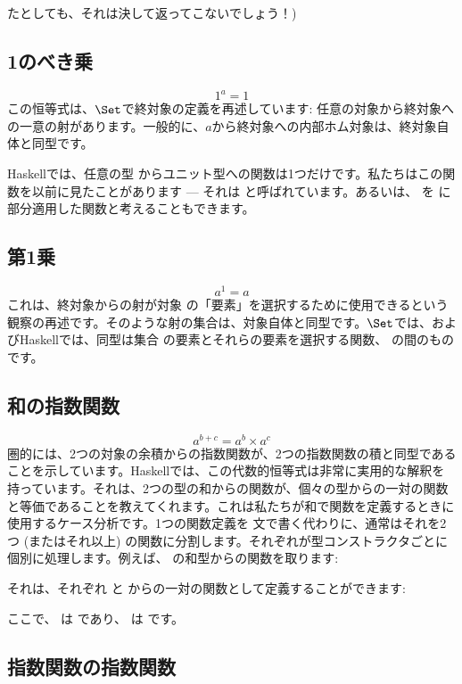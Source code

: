 たとしても、それは決して返ってこないでしょう！) 

\subsection{1のべき乗}

\[1^{a} = 1\]
この恒等式は、$\Set$で終対象の定義を再述しています: 任意の対象から終対象への一意の射があります。一般的に、$a$から終対象への内部ホム対象は、終対象自体と同型です。

Haskellでは、任意の型  からユニット型への関数は1つだけです。私たちはこの関数を以前に見たことがあります --- それは  と呼ばれています。あるいは、 を \code{()} に部分適用した関数と考えることもできます。

\subsection{第1乗}

\[a^{1} = a\]
これは、終対象からの射が対象  の「要素」を選択するために使用できるという観察の再述です。そのような射の集合は、対象自体と同型です。$\Set$では、およびHaskellでは、同型は集合  の要素とそれらの要素を選択する関数、 の間のものです。

\subsection{和の指数関数}

\[a^{b+c} = a^{b} \times a^{c}\]
圏的には、2つの対象の余積からの指数関数が、2つの指数関数の積と同型であることを示しています。Haskellでは、この代数的恒等式は非常に実用的な解釈を持っています。それは、2つの型の和からの関数が、個々の型からの一対の関数と等価であることを教えてくれます。これは私たちが和で関数を定義するときに使用するケース分析です。1つの関数定義を  文で書く代わりに、通常はそれを2つ (またはそれ以上) の関数に分割します。それぞれが型コンストラクタごとに個別に処理します。例えば、 の和型からの関数を取ります: 

それは、それぞれ  と  からの一対の関数として定義することができます: 

ここで、 は  であり、 は  です。

\subsection{指数関数の指数関数}

